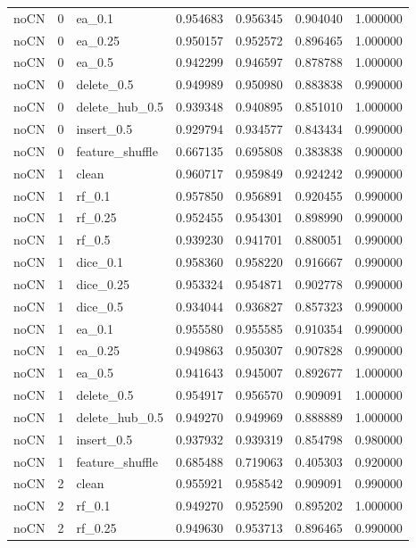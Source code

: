 \documentclass[UTF8,a4paper,11pt,fontset=fandol]{ctexart}
\begin{document}
{\begin{longtable}{lrlrrrr}
noCN & 0 & ea\_0.1 & 0.954683 & 0.956345 & 0.904040 & 1.000000 \\
noCN & 0 & ea\_0.25 & 0.950157 & 0.952572 & 0.896465 & 1.000000 \\
noCN & 0 & ea\_0.5 & 0.942299 & 0.946597 & 0.878788 & 1.000000 \\
noCN & 0 & delete\_0.5 & 0.949989 & 0.950980 & 0.883838 & 0.990000 \\
noCN & 0 & delete\_hub\_0.5 & 0.939348 & 0.940895 & 0.851010 & 1.000000 \\
noCN & 0 & insert\_0.5 & 0.929794 & 0.934577 & 0.843434 & 0.990000 \\
noCN & 0 & feature\_shuffle & 0.667135 & 0.695808 & 0.383838 & 0.900000 \\
noCN & 1 & clean & 0.960717 & 0.959849 & 0.924242 & 0.990000 \\
noCN & 1 & rf\_0.1 & 0.957850 & 0.956891 & 0.920455 & 0.990000 \\
noCN & 1 & rf\_0.25 & 0.952455 & 0.954301 & 0.898990 & 0.990000 \\
noCN & 1 & rf\_0.5 & 0.939230 & 0.941701 & 0.880051 & 0.990000 \\
noCN & 1 & dice\_0.1 & 0.958360 & 0.958220 & 0.916667 & 0.990000 \\
noCN & 1 & dice\_0.25 & 0.953324 & 0.954871 & 0.902778 & 0.990000 \\
noCN & 1 & dice\_0.5 & 0.934044 & 0.936827 & 0.857323 & 0.990000 \\
noCN & 1 & ea\_0.1 & 0.955580 & 0.955585 & 0.910354 & 0.990000 \\
noCN & 1 & ea\_0.25 & 0.949863 & 0.950307 & 0.907828 & 0.990000 \\
noCN & 1 & ea\_0.5 & 0.941643 & 0.945007 & 0.892677 & 1.000000 \\
noCN & 1 & delete\_0.5 & 0.954917 & 0.956570 & 0.909091 & 1.000000 \\
noCN & 1 & delete\_hub\_0.5 & 0.949270 & 0.949969 & 0.888889 & 1.000000 \\
noCN & 1 & insert\_0.5 & 0.937932 & 0.939319 & 0.854798 & 0.980000 \\
noCN & 1 & feature\_shuffle & 0.685488 & 0.719063 & 0.405303 & 0.920000 \\
noCN & 2 & clean & 0.955921 & 0.958542 & 0.909091 & 0.990000 \\
noCN & 2 & rf\_0.1 & 0.949270 & 0.952590 & 0.895202 & 1.000000 \\
noCN & 2 & rf\_0.25 & 0.949630 & 0.953713 & 0.896465 & 0.990000 \\

\end{longtable}}
\end{document}
